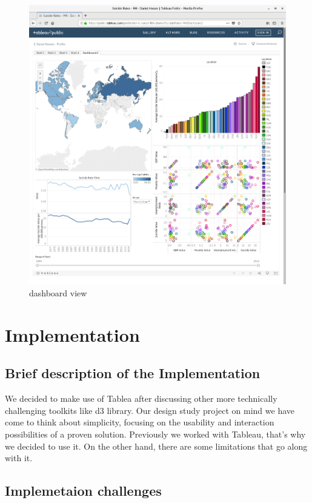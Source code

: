 \documentclass{vgtc}                          %
\begin{document}
\begin{figure}[tb]
\centering
\includegraphics[width=\columnwidth]{image/roman/tableau.png}
\caption{dashboard view}
\label{fig:dash} 
\end{figure}

\section{Implementation}

\subsection{Brief description of the Implementation}

We decided to make use of Tablea after discussing other more technically challenging toolkits like d3 library. Our design study project on mind we have come to think about simplicity, focusing on the usability and interaction possibilities of a proven solution. Previously we worked with Tableau, that's why we decided to use it. On the other hand, there are some limitations that go along with it. 


\subsection{Implemetaion challenges}
\end{document}
